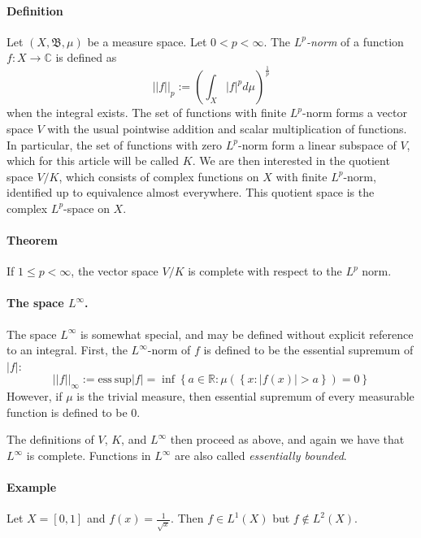 \documentclass{article}
\newcommand{\borel}{\mathfrak{B}}
\newcommand{\reals}{\mathbb{R}}
\newcommand{\complexes}{\mathbb{C}}
\newcommand{\defined}{:=}
\newcommand{\set}[1]{\left\{#1\right\}}
\newcommand{\abs}[1]{\left|#1\right|}
\newcommand{\norm}[1]{\left|\left|#1\right|\right|}
\newcommand{\esssup}{\mathrm{ess\ sup}}
\newcommand{\Lspace}[1]{L^{#1}}
\newcommand{\Lone}{\Lspace{1}}
\newcommand{\Ltwo}{\Lspace{2}}
\newcommand{\Lp}{\Lspace{p}}
\newcommand{\Linf}{\Lspace{\infty}}
\begin{document}
\paragraph{Definition}
Let $(X, \borel, \mu)$ be a measure space. Let $0<p < \infty$.  The \emph{$\Lp$-norm} of a function $f:X\rightarrow \complexes$ is defined as
\begin{equation}
\norm{f}_{p} \defined \left(\int_{X}  \abs{f}^p d\mu \right)^{\frac{1}{p}}
\end{equation}
when the integral exists.  The set of functions with finite $\Lp$-norm forms a vector space $V$ with the usual pointwise addition and scalar 
multiplication of functions.  In particular, the set of functions with zero $\Lp$-norm form a linear subspace of $V$, which for this article 
will be called $K$.  We are then interested in the quotient space $V/K$, which consists of complex functions on $X$ with finite $\Lp$-norm, 
identified up to equivalence almost everywhere.  This quotient space is the complex $\Lp$-space on $X$.

\paragraph{Theorem} If $1 \leq p < \infty$, the vector space $V/K$ is complete with respect to the $\Lp$ norm.

\paragraph{The space $\Linf$.}
The space $\Linf$ is somewhat special, and may be defined without explicit reference to an integral.  First, the $\Linf$-norm of $f$ is 
defined to be the essential supremum of $\abs{f}$:
\begin{equation}
\norm{f}_{\infty} \defined \esssup \abs{f} = \inf \set{a \in \reals: \mu(\set{x: \abs{f(x)} > a}) = 0}
\end{equation}
However, if $\mu$ is the trivial measure, then essential supremum of every measurable function
is defined to be 0.

The definitions of $V$, $K$, and $\Linf$ then proceed as above, and again we have that $L^\infty$ is complete.  Functions in $\Linf$ are also called {\em essentially bounded}.

\paragraph{Example}
Let $X = [0,1]$ and $f(x) = \frac{1}{\sqrt{x}}$.  Then $f \in \Lone(X)$ but $f \notin \Ltwo(X)$.

\end{document}
